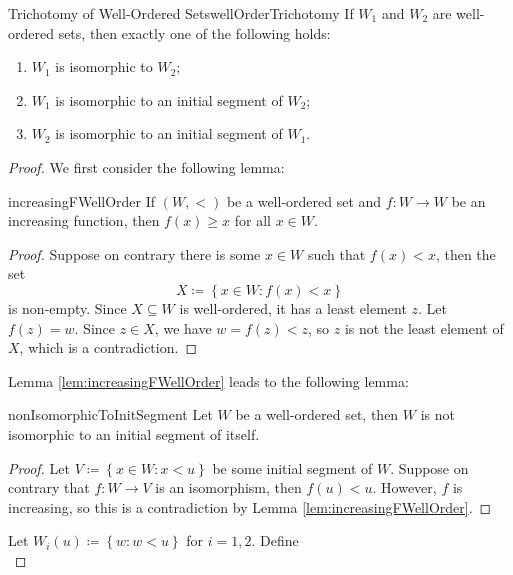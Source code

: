 \documentclass[math]{amznotes}
\theoremstyle{remark}
\begin{document}
\begin{thmbox}{Trichotomy of Well-Ordered Sets}{wellOrderTrichotomy}
    If $W_1$ and $W_2$ are well-ordered sets, then exactly one of the following holds:
    \begin{enumerate}
        \item $W_1$ is isomorphic to $W_2$;
        \item $W_1$ is isomorphic to an initial segment of $W_2$;
        \item $W_2$ is isomorphic to an initial segment of $W_1$.
    \end{enumerate}
    \tcblower
    \begin{proof}
        We first consider the following lemma:
        \begin{lembox}{}{increasingFWellOrder}
            If $(W, <)$ be a well-ordered set and $f \colon W \to W$ be an increasing function, then $f(x) \geq x$ for all $x \in W$.
            \tcblower
            \begin{proof}
                Suppose on contrary there is some $x \in W$ such that $f(x) < x$, then the set 
                \begin{equation*}
                    X \coloneqq \left\{x \in W \colon f(x) < x\right\} 
                \end{equation*}
                is non-empty. Since $X \subseteq W$ is well-ordered, it has a least element $z$. Let $f(z) = w$. Since $z \in X$, we have $w = f(z) < z$, so $z$ is not the least element of $X$, which is a contradiction.
            \end{proof}  
        \end{lembox}
        Lemma \ref{lem:increasingFWellOrder} leads to the following lemma:
        \begin{lembox}{}{nonIsomorphicToInitSegment}
            Let $W$ be a well-ordered set, then $W$ is not isomorphic to an initial segment of itself.
            \tcblower
            \begin{proof}
                Let $V \coloneqq \left\{x \in W \colon x < u\right\}$ be some initial segment of $W$. Suppose on contrary that $f \colon W \to V$ is an isomorphism, then $f(u) < u$. However, $f$ is increasing, so this is a contradiction by Lemma \ref{lem:increasingFWellOrder}.
            \end{proof}
        \end{lembox}
        Let $W_i(u) \coloneqq \left\{w \colon w < u\right\}$ for $i = 1, 2$. Define
        \begin{equation*}

\end{equation*}
\end{proof}
\end{thmbox}
\end{document}
